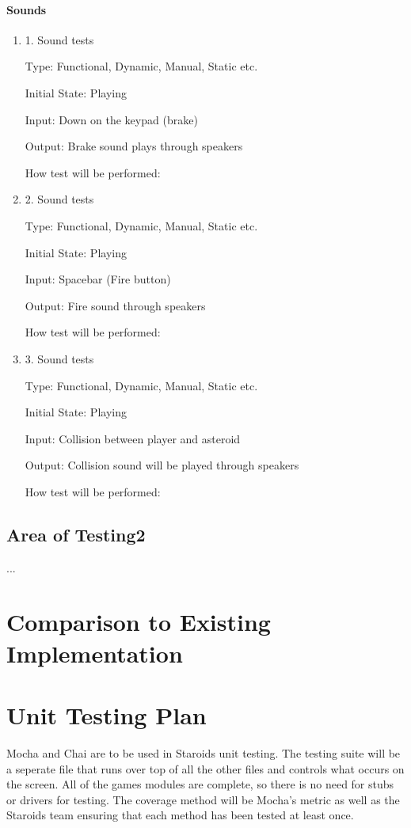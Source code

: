 \documentclass[12pt, titlepage]{article}
\begin{document}
\paragraph{Sounds}
\begin{enumerate}
\item{1. Sound tests\\}

Type: Functional, Dynamic, Manual, Static etc.

Initial State: Playing

Input: Down on the keypad (brake)

Output: Brake sound plays through speakers

How test will be performed:

\item{2. Sound tests\\}

Type: Functional, Dynamic, Manual, Static etc.

Initial State: Playing

Input: Spacebar (Fire button)

Output: Fire sound through speakers

How test will be performed:

\item{3. Sound tests\\}

Type: Functional, Dynamic, Manual, Static etc.

Initial State: Playing

Input: Collision between player and asteroid

Output: Collision sound will be played through speakers

How test will be performed:

\end{enumerate}

\subsection{Area of Testing2}

...


\section{Comparison to Existing Implementation}

\section{Unit Testing Plan}
Mocha and Chai are to be used in Staroids unit testing. The testing suite will be a seperate file that runs over top of all the other files and controls what occurs on the screen. All of the games modules are complete, so there is no need for stubs or drivers for testing. The coverage method will be Mocha's metric as well as the Staroids team ensuring that each method has been tested at least once.
\end{document}
